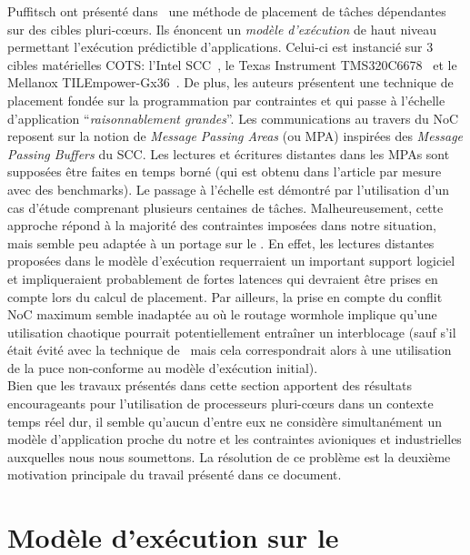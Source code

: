 \documentclass[main.tex]{subfiles}
\begin{document}
Puffitsch \etal ont présenté dans~\cite{PuffitschNP15} une méthode de placement de tâches dépendantes sur des cibles pluri-c\oe{}urs. Ils énoncent un \emph{modèle d'exécution} de haut niveau permettant l'exécution prédictible d'applications. Celui-ci est instancié sur 3 cibles matérielles COTS: l'Intel SCC~\cite{intel_scc}, le Texas Instrument TMS320C6678~\cite{TMS320C6678} et le Mellanox TILEmpower-Gx36~\cite{TileGx36}. De plus, les auteurs présentent une technique de placement fondée sur la programmation par contraintes et qui passe à l'échelle d'application ``\emph{raisonnablement grandes}''. Les communications au travers du NoC reposent sur la notion de \emph{Message Passing Areas} (ou MPA) inspirées des \emph{Message Passing Buffers} du SCC. Les lectures et écritures distantes dans les MPAs sont supposées être faites en temps borné (qui est obtenu dans l'article par mesure avec des benchmarks). Le passage à l'échelle est démontré par l'utilisation d'un cas d'étude comprenant plusieurs centaines de tâches. Malheureusement, cette approche répond à la majorité des contraintes imposées dans notre situation, mais semble peu adaptée à un portage sur le \mppalong. En effet, les lectures distantes proposées dans le modèle d'exécution requerraient un important support logiciel et impliqueraient probablement de fortes latences qui devraient être prises en compte lors du calcul de placement. Par ailleurs, la prise en compte du conflit NoC maximum semble inadaptée au \mppalong où le routage wormhole implique qu'une utilisation chaotique pourrait potentiellement entraîner un interblocage (sauf s'il était évité avec la technique de~\cite{Dinechin2014NoCArc} mais cela correspondrait alors à une utilisation de la puce non-conforme au modèle d'exécution initial). \\

Bien que les travaux présentés dans cette section apportent des résultats encourageants pour l'utilisation de processeurs pluri-c\oe{}urs dans un contexte temps réel dur, il semble qu'aucun d'entre eux ne considère simultanément un modèle d'application proche du notre et les contraintes avioniques et industrielles auxquelles nous nous soumettons. La résolution de ce problème est la deuxième motivation principale du travail présenté dans ce document.







\section{Modèle d'exécution sur le \mppalong}
\label{sec_resumeFr_execModel}
\end{document}
